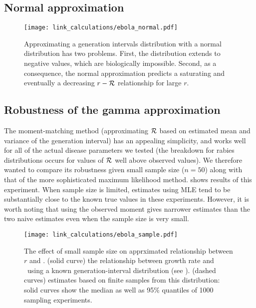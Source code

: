 

\subsection{Normal approximation}

\begin{figure}[htbp] \centering
	\texttt{[image: link\_calculations/ebola\_normal.pdf]}
\caption{
Approximating a generation intervals distribution with a normal distribution has two problems. First, the distribution extends to negative values, which are biologically impossible. Second, as a consequence, the normal approximation predicts a saturating and eventually a decreasing $r-{\cal R}$ relationship for large $r$.
}
	\label{fig:ebolaNormal}
\end{figure}

\subsection{Robustness of the gamma approximation}

The moment-matching method (approximating ${\cal R}$ based on estimated mean and variance of the generation interval) has an appealing simplicity, and works well for all of the actual disease parameters we tested (the breakdown for rabies distributions occurs for values of ${\cal R}$ well above observed values). We therefore wanted to compare its robustness given small sample size ($n=50$) along with that of the more sophisticated maximum likelihood method.  shows results of this experiment. When sample size is limited, estimates using MLE tend to be substantially close to the known true values in these experiments. However, it is worth noting that using the observed moment gives narrower estimates than the two naive estimates even when the sample size is very small.

\begin{figure}[htbp] \centering
	\texttt{[image: link\_calculations/ebola\_sample.pdf]}
\caption{
%
The effect of small sample size on apprximated relationship between $r$ and \RR.
(solid curve) the relationship between growth rate and \RR~using a known generation-interval distribution (see ).
(dashed curves) estimates based on finite samples from this distribution: solid curves show the median as well as 95\% quantiles of 1000 sampling experiments.
%
}
	\label{fig:ebolaSample}
\end{figure}




